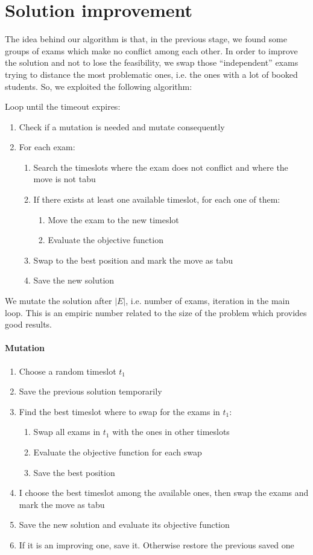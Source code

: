 \section*{Solution improvement}
The idea behind our algorithm is that, in the previous stage, we found some groups of exams which make no conflict among each other. In order to improve the solution and not to lose the feasibility, we swap those ``independent'' exams trying to distance the most problematic ones, i.e. the ones with a lot of booked students.
So, we exploited the following algorithm:

Loop until the timeout expires:
\begin{enumerate}
\item Check if a mutation is needed and mutate consequently
\item For each exam:
\begin{enumerate}
\item Search the timeslots where the exam does not conflict and where the move is not tabu
\item If there exists at least one available timeslot, for each one of them:
\begin{enumerate}
\item Move the exam to the new timeslot
\item Evaluate the objective function
\end{enumerate}
\item Swap to the best position and mark the move as tabu
\item Save the new solution
\end{enumerate}
\end{enumerate}
We mutate the solution after $|E|$, i.e. number of exams, iteration in the main loop. This is an empiric number related to the size of the problem which provides good results.
\paragraph*{Mutation}
\begin{enumerate}
\item Choose a random timeslot $t_1$
\item Save the previous solution temporarily
\item Find the best timeslot where to swap for the exams in $t_1$:
\begin{enumerate}
\item Swap all exams in $t_1$ with the ones in other timeslots
\item Evaluate the objective function for each swap
\item Save the best position
\end{enumerate}
\item I choose the best timeslot among the available ones, then swap the exams and mark the move as tabu
\item Save the new solution and evaluate its objective function
\item If it is an improving one, save it. Otherwise restore the previous saved one
\end{enumerate}